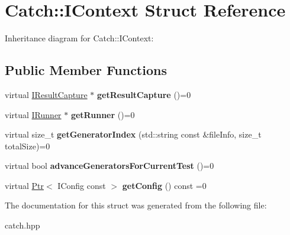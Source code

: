 \hypertarget{structCatch_1_1IContext}{}\section{Catch\+:\+:I\+Context Struct Reference}
\label{structCatch_1_1IContext}


Inheritance diagram for Catch\+:\+:I\+Context\+:
\subsection*{Public Member Functions}
\begin{DoxyCompactItemize}
\item 
virtual \hyperlink{structCatch_1_1IResultCapture}{I\+Result\+Capture} $\ast$ {\bfseries get\+Result\+Capture} ()=0\hypertarget{structCatch_1_1IContext_a684e4ae71d1fdf3060c352ecde1d122f}{}\label{structCatch_1_1IContext_a684e4ae71d1fdf3060c352ecde1d122f}

\item 
virtual \hyperlink{structCatch_1_1IRunner}{I\+Runner} $\ast$ {\bfseries get\+Runner} ()=0\hypertarget{structCatch_1_1IContext_af088415dde18d039ed5a2f95b02767c6}{}\label{structCatch_1_1IContext_af088415dde18d039ed5a2f95b02767c6}

\item 
virtual size\+\_\+t {\bfseries get\+Generator\+Index} (std\+::string const \&file\+Info, size\+\_\+t total\+Size)=0\hypertarget{structCatch_1_1IContext_a43e07088db43299ba129fbe6d3106e95}{}\label{structCatch_1_1IContext_a43e07088db43299ba129fbe6d3106e95}

\item 
virtual bool {\bfseries advance\+Generators\+For\+Current\+Test} ()=0\hypertarget{structCatch_1_1IContext_a806f7c4ed24d51adae90418e661b24b7}{}\label{structCatch_1_1IContext_a806f7c4ed24d51adae90418e661b24b7}

\item 
virtual \hyperlink{classCatch_1_1Ptr}{Ptr}$<$ I\+Config const  $>$ {\bfseries get\+Config} () const =0\hypertarget{structCatch_1_1IContext_aee81c415899262e096ad8d6f686fa365}{}\label{structCatch_1_1IContext_aee81c415899262e096ad8d6f686fa365}

\end{DoxyCompactItemize}


The documentation for this struct was generated from the following file\+:\begin{DoxyCompactItemize}
\item 
catch.\+hpp\end{DoxyCompactItemize}

